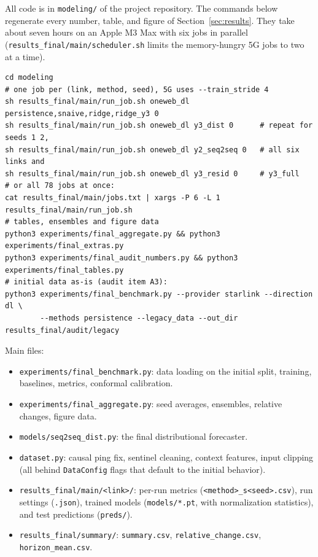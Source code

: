 All code is in \texttt{modeling/\allowbreak{}} of the project repository. The commands below regenerate every number, table, and figure of Section~\ref{sec:results}. They take about seven hours on an Apple M3 Max with six jobs in parallel (\texttt{results\_final/main/scheduler.sh} limits the memory-hungry 5G jobs to two at a time).

\begin{small}
\begin{verbatim}
cd modeling
# one job per (link, method, seed), 5G uses --train_stride 4
sh results_final/main/run_job.sh oneweb_dl persistence,snaive,ridge,ridge_y3 0
sh results_final/main/run_job.sh oneweb_dl y3_dist 0      # repeat for seeds 1 2,
sh results_final/main/run_job.sh oneweb_dl y2_seq2seq 0   # all six links and
sh results_final/main/run_job.sh oneweb_dl y3_resid 0     # y3_full
# or all 78 jobs at once:
cat results_final/main/jobs.txt | xargs -P 6 -L 1 results_final/main/run_job.sh
# tables, ensembles and figure data
python3 experiments/final_aggregate.py && python3 experiments/final_extras.py
python3 experiments/final_audit_numbers.py && python3 experiments/final_tables.py
# initial data as-is (audit item A3):
python3 experiments/final_benchmark.py --provider starlink --direction dl \
        --methods persistence --legacy_data --out_dir results_final/audit/legacy
\end{verbatim}
\end{small}

\noindent Main files:
\begin{itemize}[leftmargin=*]
  \item \texttt{experiments/\allowbreak{}final\_\allowbreak{}benchmark.py}: data loading on the initial split, training, baselines, metrics, conformal calibration.
  \item \texttt{experiments/\allowbreak{}final\_\allowbreak{}aggregate.py}: seed averages, ensembles, relative changes, figure data.
  \item \texttt{models/\allowbreak{}seq2seq\_\allowbreak{}dist.py}: the final distributional forecaster.
  \item \texttt{dataset.py}: causal ping fix, sentinel cleaning, context features, input clipping (all behind \texttt{DataConfig} flags that default to the initial behavior).
  \item \texttt{results\_\allowbreak{}final/\allowbreak{}main/\allowbreak{}<link>/\allowbreak{}}: per-run metrics (\texttt{<method>\_\allowbreak{}s<seed>.csv}), run settings (\texttt{.json}), trained models (\texttt{models/\allowbreak{}*.pt}, with normalization statistics), and test predictions (\texttt{preds/\allowbreak{}}).
  \item \texttt{results\_\allowbreak{}final/\allowbreak{}summary/\allowbreak{}}: \texttt{summary.csv}, \texttt{relative\_\allowbreak{}change.csv}, \texttt{horizon\_\allowbreak{}mean.csv}.
\end{itemize}
